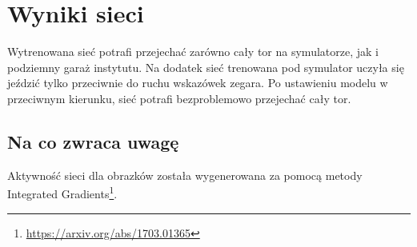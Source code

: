 \chapter{Wyniki sieci}
Wytrenowana sieć potrafi przejechać zarówno cały tor na symulatorze, jak i
podziemny garaż instytutu. Na dodatek sieć trenowana pod symulator uczyła się
 jeździć tylko przeciwnie do ruchu wskazówek zegara. Po ustawieniu modelu w przeciwnym
kierunku, sieć potrafi bezproblemowo przejechać cały tor.

\section{Na co zwraca uwagę}
Aktywność sieci dla obrazków została wygenerowana za pomocą metody
Integrated Gradients\footnote{\href{https://arxiv.org/abs/1703.01365}{https://arxiv.org/abs/1703.01365}}.

